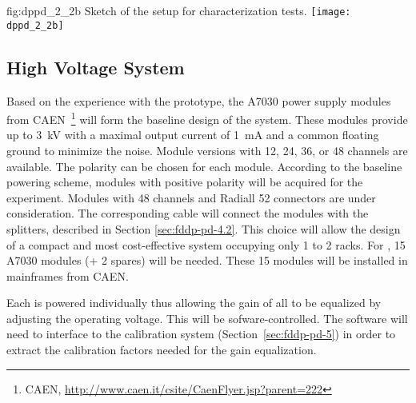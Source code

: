\begin{dunefigure}{fig:dppd_2_2b}
{Sketch of the setup for  characterization tests.}
\texttt{[image: dppd\_2\_2b]}
\end{dunefigure}

\subsection{High Voltage System}
\label{sec:fddp-pd-2.3}

Based on the experience with the  %
prototype, %
the A7030 power supply modules from CAEN~\footnote{CAEN\texttrademark{}, \url{http://www.caen.it/csite/CaenFlyer.jsp?parent=222}} 
will form the baseline design of the   system. 
These modules provide up to \SI{3}{kV} with a maximal output current of \SI{1}{mA} and a common floating ground to minimize the noise. Module versions with \num{12}, \num{24}, \num{36}, or \num{48}  channels are available. The  polarity can be chosen for each module. According to the baseline  powering scheme, modules with positive  polarity will be acquired for the experiment. Modules with \num{48}  channels and Radiall \num{52} connectors are %
under consideration. The corresponding  cable will connect the modules with the  splitters, described in Section \ref{sec:fddp-pd-4.2}. This choice will allow the design of a compact and most cost-effective system occupying only %
\num{1} to \num{2} racks. %
For \dpnumpmtch {}, \num{15} A7030 modules (+ \num{2} spares) will be needed. These \num{15}  modules will be installed in mainframes from CAEN.

Each  is powered individually thus allowing the gain of all  to be equalized by adjusting the operating voltage. %
This will be sofware-controlled. The software will need to interface to the  calibration system (Section~\ref{sec:fddp-pd-5}) in order to extract the calibration factors needed for the gain equalization.

